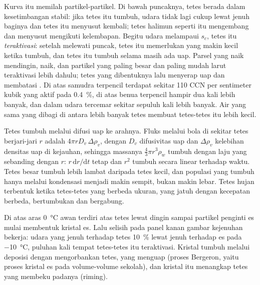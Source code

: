 Kurva itu memilah partikel-partikel. Di bawah puncaknya, tetes berada dalam kesetimbangan stabil: jika tetes itu tumbuh,
udara tidak lagi cukup lewat jenuh baginya dan tetes itu menyusut kembali; tetes halimun seperti itu mengembang
dan menyusut mengikuti kelembapan. Begitu  udara melampaui $s_c$, tetes itu
\emph{teraktivasi}: setelah melewati puncak, tetes itu memerlukan  yang makin kecil ketika tumbuh, dan tetes itu tumbuh
selama masih ada uap. Parsel yang naik mendingin,  naik, dan partikel yang paling besar
dan paling mudah larut teraktivasi lebih dahulu; tetes yang dibentuknya lalu menyerap uap dan
membatasi . Di atas samudra terpencil terdapat sekitar 110 CCN per sentimeter kubik yang aktif
pada \qty{0.4}{\percent}, di atas benua terpencil hampir dua kali lebih banyak, dan dalam udara tercemar sekitar
sepuluh kali lebih banyak. Air yang sama yang dibagi di antara lebih banyak tetes membuat tetes-tetes itu lebih kecil.

\begin{remark}\label{rem:b2:atmospheric-thermodynamics:growth}
Tetes tumbuh melalui difusi uap ke arahnya. Fluks melalui bola di sekitar tetes
berjari-jari $r$ adalah $4\pi r D_v\,\Delta\rho_v$, dengan $D_v$ difusivitas uap dan
$\Delta\rho_v$ kelebihan densitas uap di kejauhan, sehingga massanya $\tfrac43\pi r^3\rho_w$ tumbuh
dengan laju yang sebanding dengan $r$: $r\,\mathrm{d}r/\mathrm{d}t$ tetap dan $r^2$ tumbuh secara linear terhadap
waktu. Tetes besar tumbuh lebih lambat daripada tetes kecil, dan populasi yang tumbuh hanya melalui kondensasi
menjadi makin sempit, bukan makin lebar. Tetes hujan terbentuk ketika tetes-tetes yang berbeda ukuran, yang jatuh dengan
kecepatan berbeda, bertumbukan dan bergabung.
\end{remark}

Di atas aras \qty{0}{\celsius} awan terdiri atas tetes lewat dingin sampai partikel penginti es
mulai membentuk kristal es. Lalu selisih pada panel kanan
gambar kejenuhan bekerja: udara yang jenuh terhadap tetes \qty{10}{\percent} lewat jenuh terhadap
es pada \qty{-10}{\celsius}, puluhan kali  tempat tetes-tetes itu teraktivasi.
Kristal tumbuh melalui deposisi dengan mengorbankan tetes, yang menguap (proses
Bergeron, yaitu proses kristal es pada volume-volume sekolah), dan kristal itu menangkap tetes yang membeku
padanya (riming).

